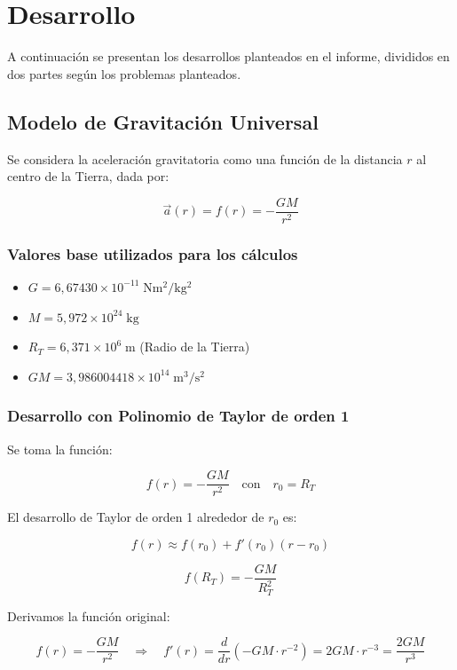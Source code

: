 \documentclass{article}
\begin{document}
\section{Desarrollo}\label{sec:desarrollo}
A continuación se presentan los desarrollos planteados en el informe, divididos en dos partes según los problemas planteados.

\subsection{Modelo de Gravitación Universal}

Se considera la aceleración gravitatoria como una función de la distancia $r$ al centro de la Tierra, dada por:

\[
\vec{a}(r) = f(r) = -\frac{GM}{r^2}
\]

\subsubsection*{Valores base utilizados para los cálculos}

\begin{itemize}
    \item $G = 6{,}67430 \times 10^{-11} \; \mathrm{Nm^2/kg^2}$
    \item $M = 5{,}972 \times 10^{24} \; \mathrm{kg}$
    \item $R_T = 6{,}371 \times 10^{6} \; \mathrm{m}$ \hfill (Radio de la Tierra)
    \item $GM = 3{,}986004418 \times 10^{14} \; \mathrm{m^3/s^2}$
\end{itemize}

\subsubsection{Desarrollo con Polinomio de Taylor de orden 1}

Se toma la función:

\[
f(r) = -\frac{GM}{r^2}
\quad \text{con} \quad r_0 = R_T
\]

El desarrollo de Taylor de orden 1 alrededor de $r_0$ es:

\[
f(r) \approx f(r_0) + f'(r_0)(r - r_0)
\]

\[
f(R_T) = -\frac{GM}{R_T^2}
\]

Derivamos la función original:

\[
f(r) = -\frac{GM}{r^2}
\quad \Rightarrow \quad
f'(r) = \frac{d}{dr} \left( -GM \cdot r^{-2} \right) = 2GM \cdot r^{-3} = \frac{2GM}{r^3}
\]
\end{document}
